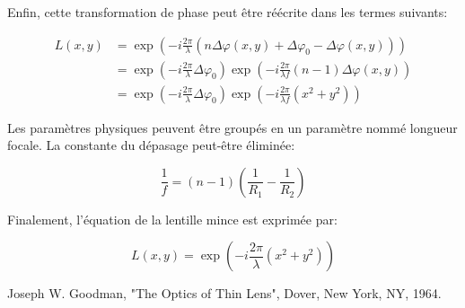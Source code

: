 \documentclass[a4paper]{article}
\begin{document}
Enfin, cette transformation de phase peut être réécrite dans les termes suivants: 

\begin{equation}
\begin{split}
L(x,y) &= \exp\left(-i\frac{2\pi}{\lambda}(n\Delta\varphi(x,y)+\Delta\varphi_0-\Delta\varphi(x,y))\right) \\
       &= \exp\left(-i\frac{2\pi}{\lambda}\Delta\varphi_0\right) \exp\left(-i\frac{2\pi}{\lambda f}(n-1)\Delta\varphi(x,y)\right) \\
       &= \exp\left(-i\frac{2\pi}{\lambda}\Delta\varphi_0\right) \exp\left(-i\frac{2\pi}{\lambda f}(x^2+y^2)\right)       
\end{split}
\end{equation}

Les paramètres physiques peuvent être groupés en un paramètre nommé longueur focale. La constante du dépasage peut-être éliminée:

\begin{equation}
    \frac{1}{f}=(n-1)\left(\frac{1}{R_1}-\frac{1}{R_2}\right)
\end{equation}

Finalement, l'équation de la lentille mince est exprimée par:

\begin{equation}
    L(x,y)=\exp\left(-i\frac{2\pi}{\lambda}(x^2+y^2)\right)
\end{equation}

\begin{thebibliography}{1}
    Joseph W. Goodman, "The Optics of Thin Lens", Dover, New York, NY, 1964.
\end{thebibliography}
\end{document}
